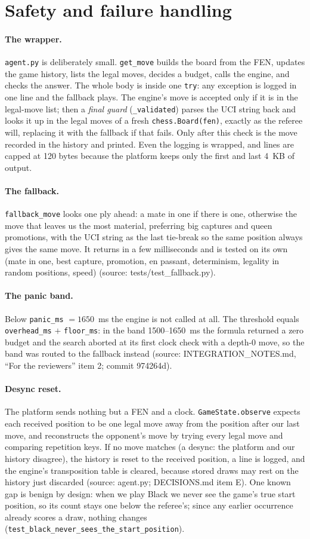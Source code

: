\documentclass[11pt,a4paper]{article}
\newcommand{\src}[1]{{\small(source: #1)}}
\newcommand{\code}[1]{\texttt{#1}}
\begin{document}
\section{Safety and failure handling}\label{sec:safety}
\paragraph{The wrapper.} \code{agent.py} is deliberately small. \code{get\_move} builds the board from
the FEN, updates the game history, lists the legal moves, decides a budget, calls the engine, and checks
the answer. The whole body is inside one \code{try}: any exception is logged in one line and the fallback
plays. The engine's move is accepted only if it is in the legal-move list; then a \emph{final guard}
(\code{\_validated}) parses the UCI string back and looks it up in the legal moves of a fresh
\code{chess.Board(fen)}, exactly as the referee will, replacing it with the fallback if that fails. Only
after this check is the move recorded in the history and printed. Even the logging is wrapped, and lines
are capped at 120 bytes because the platform keeps only the first and last 4~KB of output.
\paragraph{The fallback.} \code{fallback\_move} looks one ply ahead: a mate in one if there is one,
otherwise the move that leaves us the most material, preferring big captures and queen promotions, with the
UCI string as the last tie-break so the same position always gives the same move. It returns in a few
milliseconds and is tested on its own (mate in one, best capture, promotion, en passant, determinism,
legality in random positions, speed) \src{tests/test\_fallback.py}.
\paragraph{The panic band.} Below \code{panic\_ms} $= 1650$~ms the engine is not called at all. The
threshold equals \code{overhead\_ms} $+$ \code{floor\_ms}: in the band 1500--1650~ms the formula returned
a zero budget and the search aborted at its first clock check with a depth-0 move, so the band was routed
to the fallback instead \src{INTEGRATION\_NOTES.md, ``For the reviewers'' item 2; commit 974264d}.
\paragraph{Desync reset.} The platform sends nothing but a FEN and a clock. \code{GameState.observe}
expects each received position to be one legal move away from the position after our last move, and
reconstructs the opponent's move by trying every legal move and comparing repetition keys. If no move
matches (a desync: the platform and our history disagree), the history is reset to the received position,
a line is logged, and the engine's transposition table is cleared, because stored draws may rest on the
history just discarded \src{agent.py; DECISIONS.md item E}. One known gap is benign by design: when we
play Black we never see the game's true start position, so its count stays one below the referee's; since
any earlier occurrence already scores a draw, nothing changes
(\code{test\_black\_never\_sees\_the\_start\_position}).
\end{document}

